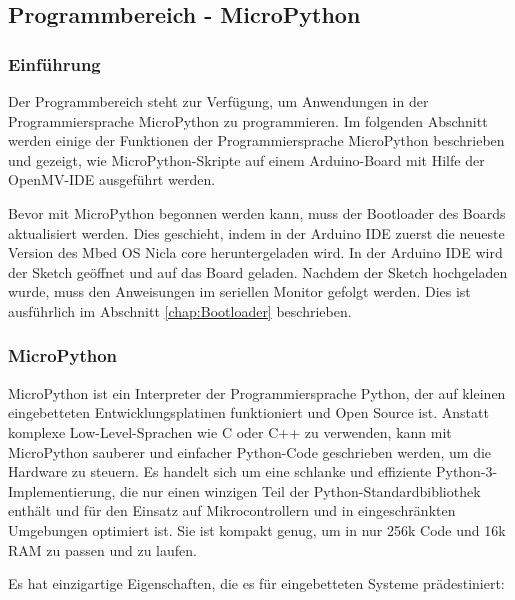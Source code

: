 \subsection{Programmbereich  - MicroPython}


\subsubsection{Einführung}

Der Programmbereich steht zur Verfügung,  um Anwendungen in der Programmiersprache MicroPython zu programmieren. Im folgenden Abschnitt werden einige der Funktionen der Programmiersprache MicroPython beschrieben und gezeigt, wie MicroPython-Skripte auf einem Arduino-Board mit Hilfe der OpenMV-IDE ausgeführt werden.

Bevor mit MicroPython begonnen werden kann, muss der Bootloader des Boards aktualisiert werden. Dies geschieht, indem in der Arduino IDE zuerst die neueste Version des \glqq Mbed OS Nicla core\grqq{}  heruntergeladen wird. In der Arduino IDE wird der Sketch  geöffnet und auf das Board geladen. Nachdem der Sketch hochgeladen wurde, muss den Anweisungen im seriellen Monitor gefolgt werden. Dies ist ausführlich im Abschnitt \ref{chap:Bootloader} beschrieben.

\subsubsection{MicroPython}

MicroPython ist ein Interpreter der Programmiersprache Python, der auf kleinen eingebetteten Entwicklungsplatinen funktioniert und Open Source ist. Anstatt komplexe Low-Level-Sprachen wie C oder C++ zu verwenden, kann mit MicroPython sauberer und einfacher Python-Code geschrieben werden, um die Hardware zu steuern. Es handelt sich um eine schlanke und effiziente Python-3-Implementierung, die nur einen winzigen Teil der Python-Standardbibliothek enthält und für den Einsatz auf Mikrocontrollern und in eingeschränkten Umgebungen optimiert ist. Sie ist kompakt genug, um in nur 256k Code und 16k RAM zu passen und zu laufen.

Es hat einzigartige Eigenschaften, die es für eingebetteten Systeme prädestiniert:

